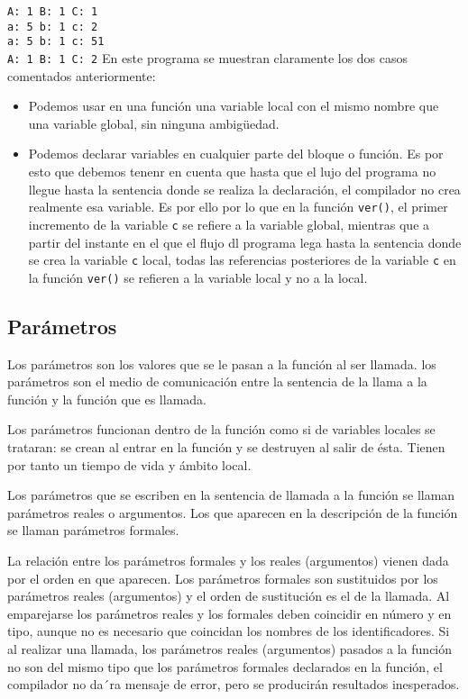 {\begin{Ejemplo}
\texttt{A: 1 B: 1 C: 1}\\
\texttt{a: 5 b: 1 c: 2}\\
\texttt{a: 5 b: 1 c: 51}\\
\texttt{A: 1 B: 1 C: 2}
\Explicacion
En este programa se muestran claramente los dos casos comentados anteriormente:
\begin{itemize}
	\item Podemos usar en una función una variable local con el mismo nombre que una variable global, sin ninguna ambigüedad.
	\item Podemos declarar variables en cualquier parte del bloque o función. Es por esto que debemos tenenr en cuenta que hasta que el lujo del programa no llegue hasta la sentencia donde se realiza la declaración, el compilador no crea realmente esa variable. Es por ello por lo que en la función \texttt{ver()}, el primer incremento de la variable \texttt{c} se refiere a la variable global, mientras que a partir del instante en el que el flujo dl programa lega hasta la sentencia donde se crea la variable \texttt{c} local, todas las referencias posteriores de la variable \texttt{c} en la función \texttt{ver()} se refieren a la variable local y no a la local.\\
\end{itemize}
\end{Ejemplo}
}
\subsection{Parámetros}{
Los parámetros son los valores que se le pasan a la función al ser llamada. los parámetros son el medio de comunicación entre la sentencia de la llama a la función y la función que es llamada.

Los parámetros funcionan dentro de la función como si de variables locales se trataran: se crean al entrar en la función y se  destruyen al salir de ésta. Tienen por tanto un tiempo de vida y ámbito local.

Los parámetros que se escriben en la sentencia de llamada a la función se llaman parámetros reales o argumentos. Los que aparecen en la descripción de la función se llaman parámetros formales.

La relación entre los parámetros formales y los reales (argumentos) vienen dada por el orden en que aparecen. Los parámetros formales son sustituidos por los parámetros reales (argumentos) y el orden de sustitución es el de la llamada. Al emparejarse los parámetros reales y los formales deben coincidir en número y en tipo, aunque no es necesario que coincidan los nombres de los identificadores. Si al realizar una llamada, los parámetros reales (argumentos) pasados a la función no son del mismo tipo que los parámetros formales declarados en la función, el compilador no da´ra mensaje de error, pero se producirán resultados inesperados.
}
